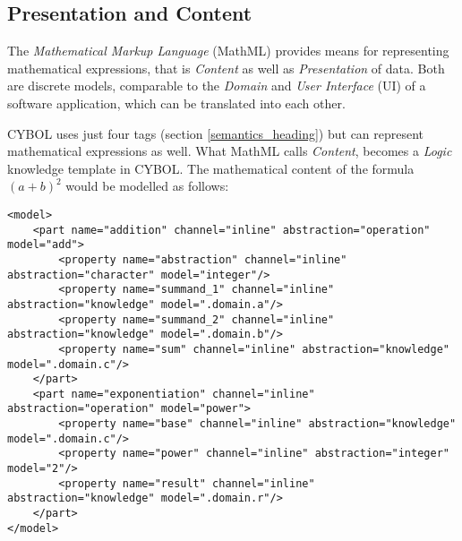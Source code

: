 %
%
%
%
%
%

\subsection{Presentation and Content}
\label{presentation_and_content_heading}

The \emph{Mathematical Markup Language} (MathML) \cite{mathml} provides means
for representing mathematical expressions, that is \emph{Content} as well as
\emph{Presentation} of data. Both are discrete models, comparable to the
\emph{Domain} and \emph{User Interface} (UI) of a software application, which
can be translated into each other.

CYBOL uses just four tags (section \ref{semantics_heading}) but can represent
mathematical expressions as well. What MathML calls \emph{Content}, becomes a
\emph{Logic} knowledge template in CYBOL. The mathematical content of the
formula $(a + b)^{2}$ would be modelled as follows:

\begin{scriptsize}
    \begin{verbatim}
<model>
    <part name="addition" channel="inline" abstraction="operation" model="add">
        <property name="abstraction" channel="inline" abstraction="character" model="integer"/>
        <property name="summand_1" channel="inline" abstraction="knowledge" model=".domain.a"/>
        <property name="summand_2" channel="inline" abstraction="knowledge" model=".domain.b"/>
        <property name="sum" channel="inline" abstraction="knowledge" model=".domain.c"/>
    </part>
    <part name="exponentiation" channel="inline" abstraction="operation" model="power">
        <property name="base" channel="inline" abstraction="knowledge" model=".domain.c"/>
        <property name="power" channel="inline" abstraction="integer" model="2"/>
        <property name="result" channel="inline" abstraction="knowledge" model=".domain.r"/>
    </part>
</model>
    \end{verbatim}
\end{scriptsize}

